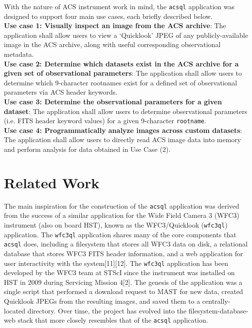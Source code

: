 \documentclass[10pt,journal,compsoc]{IEEEtran}
\begin{document}
With the nature of ACS instrument work in mind, the \texttt{acsql} application was designed to support four main use cases, each briefly described below.\\

\noindent\textbf{Use case 1: Visually inspect an image from the ACS archive}:  The application shall allow users to view a `Quicklook' JPEG of any publicly-available image in the ACS archive,
along with useful corresponding observational metadata.\\

\noindent\textbf{Use case 2: Determine which datasets exist in the ACS archive for a given set of observational parameters}:  The application shall allow users to determine which
9-character rootnames exist for a defined set of observational parameters via ACS header keywords.\\

\noindent\textbf{Use case 3: Determine the observational parameters for a given dataset}: The application shall allow users to determine observational parameters (i.e. FITS header keyword values) for
a given 9-character \texttt{rootname}.\\

\noindent\textbf{Use case 4: Programmatically analyze images across custom datasets}: The application shall allow users to directly read ACS image data into memory and perform analysis for
data obtained in Use Case (2).


\section{Related Work} \label{chap2}

The main inspiration for the construction of the \texttt{acsql} application was derived from the success of a similar application for the Wide Field Camera 3 (WFC3) instrument
(also on board HST), known as the WFC3/Quicklook (\texttt{wfc3ql}) application.  The \texttt{wfc3ql} application shares many of the core components that \texttt{acsql} does,
including a filesystem that stores all WFC3 data on disk, a relational database that stores WFC3 FITS header information, and a web application for user interactivity with the
system[11][12].  The \texttt{wfc3ql} application has been developed by the WFC3 team at STScI since the instrument was installed on HST in 2009 during Servicing Mission 4[2].  The genesis of
the application was a single script that performed a download request to MAST for new data, created Quicklook JPEGs from the resulting images, and saved them to a centrally-located
directory.  Over time, the project has evolved into the filesystem-database-web stack that more closely resembles that of the \texttt{acsql} application.
\end{document}
